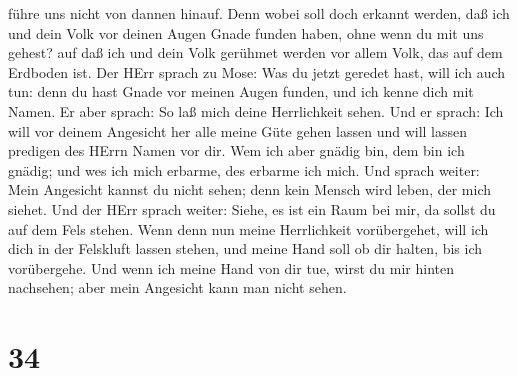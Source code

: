 führe uns nicht von dannen hinauf.  Denn wobei soll doch
erkannt werden, daß ich und dein Volk vor deinen Augen Gnade funden
haben, ohne wenn du mit uns gehest? auf daß ich und dein Volk gerühmet
werden vor allem Volk, das auf dem Erdboden ist.  Der HErr
sprach zu Mose: Was du jetzt geredet hast, will ich auch tun: denn du
hast Gnade vor meinen Augen funden, und ich kenne dich mit Namen.
 Er aber sprach: So laß mich deine Herrlichkeit sehen.
 Und er sprach: Ich will vor deinem Angesicht her alle
meine Güte gehen lassen und will lassen predigen des HErrn Namen vor
dir. Wem ich aber gnädig bin, dem bin ich gnädig; und wes ich mich
erbarme, des erbarme ich mich.  Und sprach weiter: Mein
Angesicht kannst du nicht sehen; denn kein Mensch wird leben, der mich
siehet.  Und der HErr sprach weiter: Siehe, es ist ein Raum
bei mir, da sollst du auf dem Fels stehen.  Wenn denn nun
meine Herrlichkeit vorübergehet, will ich dich in der Felskluft lassen
stehen, und meine Hand soll ob dir halten, bis ich vorübergehe.
 Und wenn ich meine Hand von dir tue, wirst du mir hinten
nachsehen; aber mein Angesicht kann man nicht sehen.

\hypertarget{section-33}{%
\section{34}\label{section-33}}

